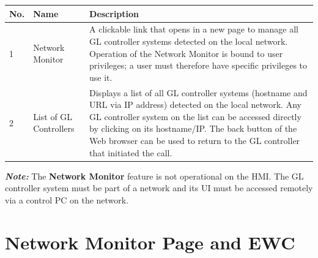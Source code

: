 \begin{longtable}[]{@{}lll@{}}
\toprule
\begin{minipage}[b]{0.18\columnwidth}\raggedright
No.\strut
\end{minipage} & \begin{minipage}[b]{0.22\columnwidth}\raggedright
Name\strut
\end{minipage} & \begin{minipage}[b]{0.51\columnwidth}\raggedright
Description\strut
\end{minipage}\tabularnewline
\midrule
\endhead
\begin{minipage}[t]{0.18\columnwidth}\raggedright
1\strut
\end{minipage} & \begin{minipage}[t]{0.22\columnwidth}\raggedright
Network Monitor\strut
\end{minipage} & \begin{minipage}[t]{0.51\columnwidth}\raggedright
A clickable link that opens in a new page to manage all GL controller
systems detected on the local network. Operation of the Network Monitor
is bound to user privileges; a user must therefore have specific
privileges to use it.\strut
\end{minipage}\tabularnewline
\begin{minipage}[t]{0.18\columnwidth}\raggedright
2\strut
\end{minipage} & \begin{minipage}[t]{0.22\columnwidth}\raggedright
List of GL Controllers\strut
\end{minipage} & \begin{minipage}[t]{0.51\columnwidth}\raggedright
Displays a list of all GL controller systems (hostname and URL via IP
address) detected on the local network. Any GL controller system on the
list can be accessed directly by clicking on its hostname/IP. The back
button of the Web browser can be used to return to the GL controller
that initiated the call.\strut
\end{minipage}\tabularnewline
\bottomrule
\end{longtable}

\textbf{\emph{Note:}} The \textbf{Network Monitor} feature is not
operational on the HMI. The GL controller system must be part of a
network and its UI must be accessed remotely via a control PC on the
network.


\section{Network Monitor Page and
EWC}

